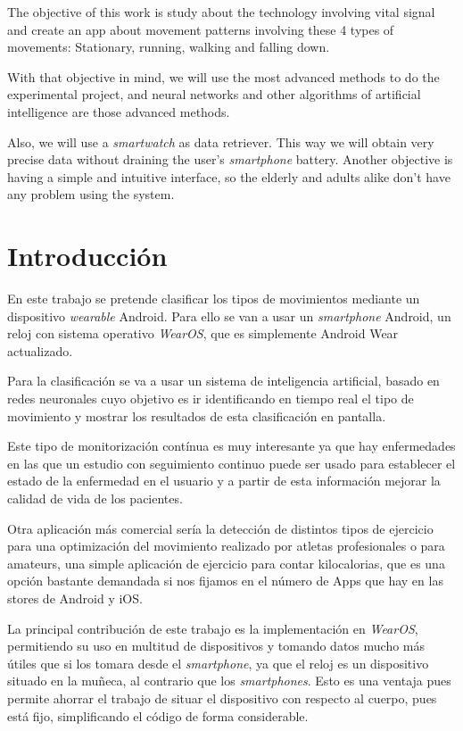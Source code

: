 \documentclass[12pt]{article}
\numberwithin{equation}{section}
\begin{document}
The objective of this work is study about the technology involving vital signal and create an app about movement patterns involving these 4 types of movements: Stationary, running, walking and falling down.

With that objective in mind, we will use the most advanced methods to do the experimental project, and neural networks and other algorithms of artificial intelligence are those advanced methods.

Also, we will use a \textit{smartwatch} as data retriever. This way we will obtain very precise data without draining the user's \textit{smartphone} battery. Another objective is having a simple and intuitive interface, so the elderly and adults alike don't have any problem using the system.

\newpage
\section{Introducción}

En este trabajo se pretende clasificar los tipos de movimientos mediante un dispositivo \textit{wearable} Android. Para ello se van a usar un \textit{smartphone} Android, un reloj con sistema operativo \textit{WearOS}, que es simplemente Android Wear actualizado.

Para la clasificación se va a usar un sistema de inteligencia artificial, basado en redes neuronales cuyo objetivo es ir identificando en tiempo real el tipo de movimiento y mostrar los resultados de esta clasificación en pantalla.

Este tipo de monitorización contínua es muy interesante ya que hay enfermedades en las que un estudio con seguimiento continuo puede ser usado para establecer el estado de la enfermedad en el usuario y a partir de esta información mejorar la calidad de vida de los pacientes.

Otra aplicación más comercial sería la detección de distintos tipos de ejercicio para una optimización del movimiento realizado por atletas profesionales o para amateurs, una simple aplicación de ejercicio para contar kilocalorias, que es una opción bastante demandada si nos fijamos en el número de Apps que hay en las stores de Android y iOS.

La principal contribución de este trabajo es la implementación en \textit{WearOS}, permitiendo su uso en multitud de dispositivos y tomando datos mucho más útiles que si los tomara desde el \textit{smartphone}, ya que el reloj es un dispositivo situado en la muñeca, al contrario que los \textit{smartphones}. Esto es una ventaja pues permite ahorrar el trabajo de situar el dispositivo con respecto al cuerpo, pues está fijo, simplificando el código de forma considerable.
\end{document}
